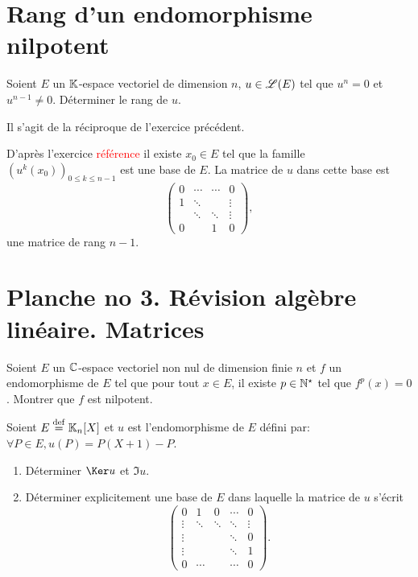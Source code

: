 \section{Rang d'un endomorphisme nilpotent} 
\begin{exercice}
    Soient $E$ un $\mathbb{K}$-espace vectoriel de dimension $n$, $u \in \mathscr{L}(E)$ tel que $u^n = 0$ et $u^{n-1} \not= 0$. Déterminer le rang de $u$.
\end{exercice}

Il s'agit de la réciproque de l'exercice précédent.

\begin{solution}
    D'après l'exercice \textcolor{red}{référence} il existe $x_0 \in E$ tel que la famille $\left( u^k(x_0)\right)_{0 \leqslant k \leqslant n-1}$ est une base de $E$. La matrice de $u$ dans cette base est 
    $$
    \begin{pmatrix}
        0 & \cdots & \cdots & 0 \\
        1 & \ddots & & \vdots \\
        & \ddots & \ddots & \vdots \\
        0 & & 1 & 0
    \end{pmatrix},
    $$
    une matrice de rang $n-1$.
\end{solution}

\section{\cite{maths-france} Planche no 3. Révision algèbre linéaire. Matrices}

\begin{exercice}
    Soient $E$ un $\mathbb{C}$-espace vectoriel non nul de dimension finie $n$ et $f$ un endomorphisme de $E$ tel que pour tout $x \in E$, il existe $p \in \mathbb{N}^\star$ tel que $f^p(x) = 0$. Montrer que $f$ est nilpotent. 
\end{exercice}

\begin{exercice}
    Soient $E \overset{\mathrm{\tiny def}}{=} \mathbb{K}_n[X]$ et $u$ est l'endomorphisme de $E$ défini par: $\forall P \in E, u(P) = P(X+1) - P$.
    \begin{enumerate}
        \item Déterminer $\Ker u$ et $\Im u$.
        \item Déterminer explicitement une base de $E$ dans laquelle la matrice de $u$ s'écrit 
        $$
        \begin{pmatrix}
            0 & 1 & 0 & \cdots & 0 \\
            \vdots & \ddots & \ddots & \ddots & \vdots \\
            \vdots & & & \ddots & 0 \\
            \vdots & & & \ddots & 1 \\
            0 & \cdots & & \cdots & 0
        \end{pmatrix}
        .$$
    \end{enumerate}
\end{exercice}


